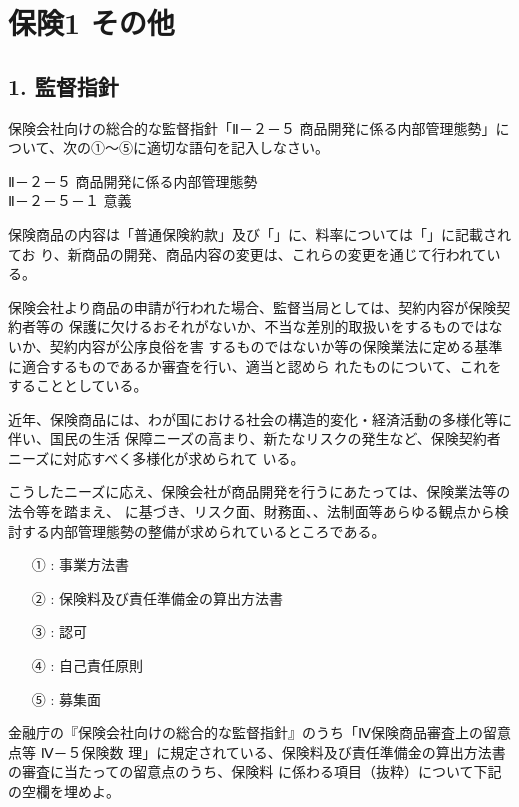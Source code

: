 \documentclass[report,gutter=10mm,fore-edge=10mm,uplatex,dvipdfmx]{jlreq}
\begin{document}
\chapter{保険1 その他}
\section{1. 監督指針}

保険会社向けの総合的な監督指針「Ⅱ－２－５ 商品開発に係る内部管理態勢」について、次の①～⑤に適切な語句を記入しなさい。

\noindent{}Ⅱ－２－５ 商品開発に係る内部管理態勢\\
Ⅱ－２－５－１ 意義

保険商品の内容は「普通保険約款」及び「」に、料率については「」に記載されてお
り、新商品の開発、商品内容の変更は、これらの変更を通じて行われている。

保険会社より商品の申請が行われた場合、監督当局としては、契約内容が保険契約者等の
保護に欠けるおそれがないか、不当な差別的取扱いをするものではないか、契約内容が公序良俗を害
するものではないか等の保険業法に定める基準に適合するものであるか審査を行い、適当と認めら
れたものについて、これをすることとしている。

近年、保険商品には、わが国における社会の構造的変化・経済活動の多様化等に伴い、国民の生活
保障ニーズの高まり、新たなリスクの発生など、保険契約者ニーズに対応すべく多様化が求められて
いる。

こうしたニーズに応え、保険会社が商品開発を行うにあたっては、保険業法等の法令等を踏まえ、
に基づき、リスク面、財務面、、法制面等あらゆる観点から検討する内部管理態勢の整備が求められているところである。

\answer{}
\begin{itemize}
\item[ ① :] 事業方法書
\item[ ② :] 保険料及び責任準備金の算出方法書
\item[ ③ :] 認可
\item[ ④ :] 自己責任原則
\item[ ⑤ :] 募集面
\end{itemize}


金融庁の『保険会社向けの総合的な監督指針』のうち「Ⅳ保険商品審査上の留意点等 Ⅳ－５保険数
理」に規定されている、保険料及び責任準備金の算出方法書の審査に当たっての留意点のうち、保険料
に係わる項目（抜粋）について下記の空欄を埋めよ。
\end{document}
